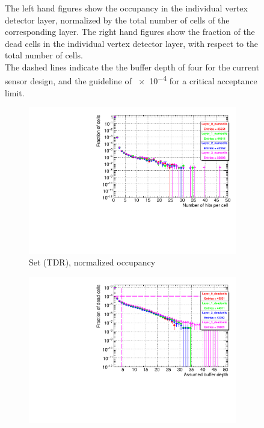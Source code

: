 \begin{figure}[htb]
{   The left hand figures show the occupancy in the individual vertex detector layer, normalized by the total number of cells of the corresponding layer.
   The right hand figures show the fraction of the dead cells in the individual vertex detector layer, with respect to the total number of cells.
   \\The dashed lines indicate the the buffer depth of four for the current sensor design, and the guideline of \num{e-4} for a critical acceptance limit.
   }
 \end{figure}

   \begin{figure}[!htbp]
 \centering
   \begin{subfigure}[b]{0.49\textwidth}
   \centering
    \includegraphics[width=\textwidth]{Figures/Pairs/Appendix/occupancy_numcells_SiVertexEndcap_ILC250_TDR.pdf}
   \caption{Set (TDR), normalized occupancy}
   \end{subfigure}
   \hfill
    \begin{subfigure}[b]{0.49\textwidth}
   \centering
    \includegraphics[width=\textwidth]{Figures/Pairs/Appendix/occupancy_deadcells_SiVertexEndcap_ILC250_TDR.pdf}

\end{subfigure}
\end{figure}

